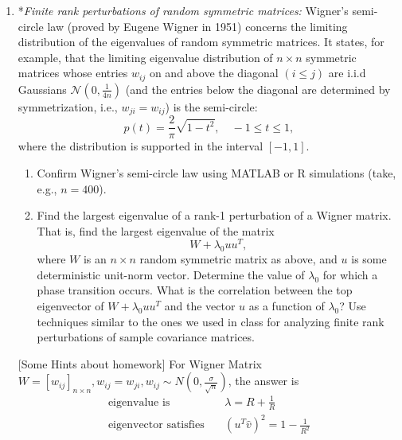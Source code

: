 \documentclass[11pt]{article}
\begin{document}
\begin{enumerate}
\begin{enumerate}
\end{enumerate}

\item *{\em Finite rank perturbations of random symmetric matrices:} Wigner's semi-circle law (proved by Eugene Wigner in 1951) concerns the limiting distribution of the eigenvalues of random symmetric matrices. It states, for example, that the limiting eigenvalue distribution of $n\times n$ symmetric matrices whose entries $w_{ij}$ on and above the diagonal $(i\leq j)$ are i.i.d Gaussians $\mathcal{N}(0,\frac{1}{4n})$ (and the entries below the diagonal are determined by symmetrization, i.e., $w_{ji}=w_{ij}$) is the semi-circle:
    $$p(t) = \frac{2}{\pi} \sqrt{1-t^2}, \quad -1\leq t \leq 1,$$
    where the distribution is supported in the interval $[-1,1]$.
\begin{enumerate}
\item Confirm Wigner's semi-circle law using MATLAB or R simulations (take, e.g., $n=400$).
\item Find the largest eigenvalue of a rank-1 perturbation of a Wigner matrix. That is, find the largest eigenvalue of the matrix $$W + \lambda_0 uu^T,$$ where $W$ is an $n\times n$ random symmetric matrix as above, and $u$ is some deterministic unit-norm vector. Determine the value of $\lambda_0$ for which a phase transition occurs. What is the correlation between the top eigenvector of $W+\lambda_0 uu^T$ and the vector $u$ as a function of $\lambda_0$? Use techniques similar to the ones we used in class for analyzing finite rank perturbations of sample covariance matrices.
\end{enumerate} 

[Some Hints about homework] For Wigner Matrix\ $W=[w_{ij}]_{n\times n},w_{ij}=w_{ji},w_{ij}\sim N(0,\frac{\sigma}{\sqrt{n}})$, 
 the answer is
$$
\begin{array}{rcl}
\textrm{eigenvalue\ is}\ & &\lambda=R+\frac{1}{R}\\
\textrm{eigenvector\ satisfies}\ && (u^{T}\hat{v})^{2}=1-\frac{1}{R^{2}} \\
\end{array}
$$



\end{enumerate}
\end{document}
